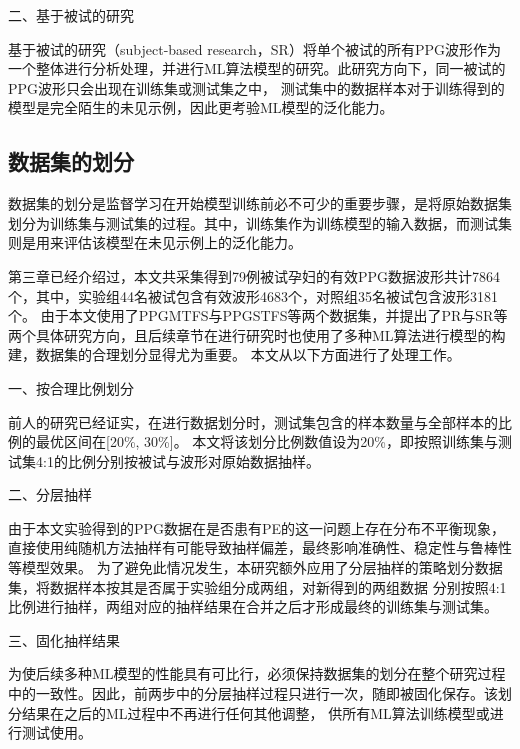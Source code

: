 二、基于被试的研究

基于被试的研究（subject-based research，SR）将单个被试的所有PPG波形作为一个整体进行分析处理，并进行ML算法模型的研究。此研究方向下，同一被试的PPG波形只会出现在训练集或测试集之中，
测试集中的数据样本对于训练得到的模型是完全陌生的未见示例，因此更考验ML模型的泛化能力。

\subsection{数据集的划分}
数据集的划分是监督学习在开始模型训练前必不可少的重要步骤，是将原始数据集划分为训练集与测试集的过程。其中，训练集作为训练模型的输入数据，而测试集则是用来评估该模型在未见示例上的泛化能力。

第三章已经介绍过，本文共采集得到79例被试孕妇的有效PPG数据波形共计7864个，其中，实验组44名被试包含有效波形4683个，对照组35名被试包含波形3181个。
由于本文使用了PPGMTFS与PPGSTFS等两个数据集，并提出了PR与SR等两个具体研究方向，且后续章节在进行研究时也使用了多种ML算法进行模型的构建，数据集的合理划分显得尤为重要。
本文从以下方面进行了处理工作。

一、按合理比例划分

前人的研究已经证实，在进行数据划分时，测试集包含的样本数量与全部样本的比例的最优区间在[20\%, 30\%]\cite{Gholamy2018Why7O}。
本文将该划分比例数值设为20\%，即按照训练集与测试集4:1的比例分别按被试与波形对原始数据抽样。

二、分层抽样

由于本文实验得到的PPG数据在是否患有PE的这一问题上存在分布不平衡现象，直接使用纯随机方法抽样有可能导致抽样偏差，最终影响准确性、稳定性与鲁棒性等模型效果\cite{Aurélien2018}。
为了避免此情况发生，本研究额外应用了分层抽样的策略划分数据集，将数据样本按其是否属于实验组分成两组，对新得到的两组数据
分别按照4:1比例进行抽样，两组对应的抽样结果在合并之后才形成最终的训练集与测试集。

三、固化抽样结果

为使后续多种ML模型的性能具有可比行，必须保持数据集的划分在整个研究过程中的一致性。因此，前两步中的分层抽样过程只进行一次，随即被固化保存。该划分结果在之后的ML过程中不再进行任何其他调整，
供所有ML算法训练模型或进行测试使用。

